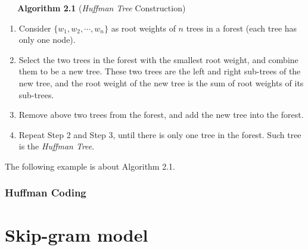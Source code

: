 \noindent \ \ \ \textbf{Algorithm 2.1} (\emph{Huffman Tree} Construction)
\begin{enumerate}
\item Consider $\{w_1,w_2,\cdots,w_n\}$ as root weights of $n$ trees in a forest (each tree has only one node).
\item Select the two trees in the forest with the smallest root weight, and combine them to be a new tree. These two trees are the left and right sub-trees of the new tree, and the root weight of the new tree is the sum of root weights of its sub-trees.
\item Remove above two trees from the forest, and add the new tree into the forest.
\item Repeat Step 2 and Step 3, until there is only one tree in the forest. Such tree is the \emph{Huffman Tree}.
\end{enumerate}

The following example is about Algorithm 2.1.
\subsubsection{Huffman Coding}


\section{Skip-gram model}


